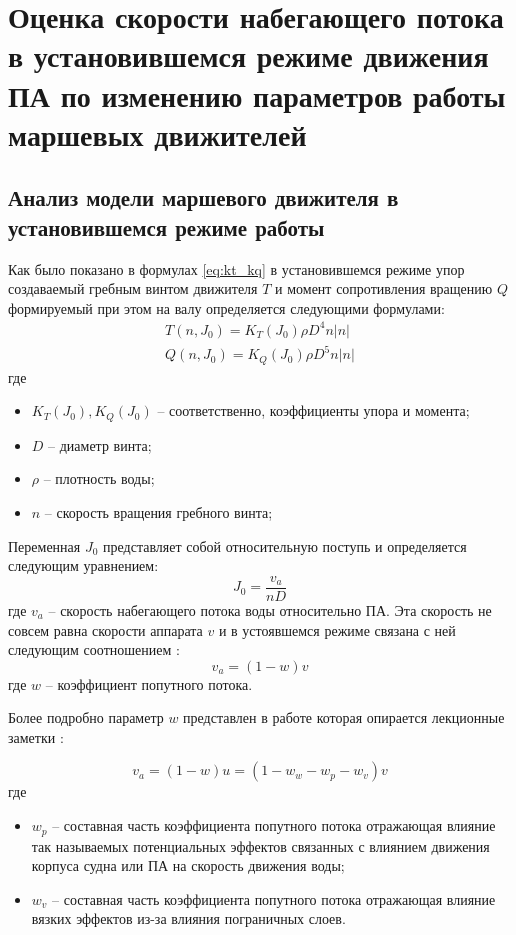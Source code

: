 \chapter{Оценка скорости набегающего потока в установившемся режиме движения ПА по изменению параметров работы маршевых движителей}\label{ch:Velocity}

\section{Анализ модели маршевого движителя в установившемся режиме работы}
Как было показано в формулах \ref{eq:kt_kq} в установившемся режиме упор создаваемый гребным винтом движителя $T$ и момент сопротивления вращению $Q$ формируемый при этом на валу определяется следующими формулами:
\begin{gather*}
    T(n, J_0) = K_T (J_0) \rho D^4 n |n|\\
    Q(n, J_0) = K_Q (J_0) \rho D^5 n |n|
\end{gather*}
\noindent где
\begin{itemize}
    \item $K_T (J_0), K_Q (J_0)$ -- соответственно, коэффициенты упора и момента;
    \item $D$ -- диаметр винта;
    \item $\rho$ -- плотность воды;
    \item $n$ -- скорость вращения гребного винта;
\end{itemize}

Переменная $J_0$ представляет собой относительную поступь и определяется следующим уравнением:
\begin{equation*}
    \label{eq:ratio_1}
    J_0 = \frac{v_a}{nD}
\end{equation*}
\noindent где $v_a$ -- скорость набегающего потока воды относительно ПА.
Эта скорость не совсем равна скорости аппарата $v$ и в устоявшемся режиме связана с ней следующим соотношением \cite{lewis1988principles}:
\begin{equation*}
    v_a = (1-w)v
\end{equation*}
\noindent где $w$ -- коэффициент попутного потока.

Более подробно параметр $w$ представлен в работе \cite{10.1016/s1474-6670-17-46514-1} которая опирается лекционные заметки \cite{walderhaug1992motstand}:

\begin{equation*}
    v_a = (1-w)u = (1 - w_w - w_p - w_v)v
\end{equation*}
\noindent где
\begin{itemize}
    \item $w_p$ -- составная часть коэффициента попутного потока отражающая влияние так называемых потенциальных эффектов связанных с влиянием движения корпуса судна или ПА на скорость движения воды;
    \item $w_v$ -- составная часть коэффициента попутного потока отражающая влияние вязких эффектов из-за влияния пограничных слоев.
\end{itemize}


